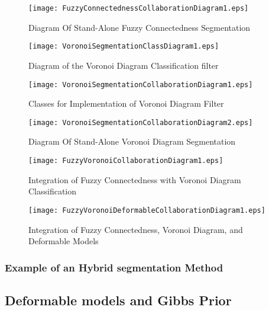 \begin{figure}
\center
\texttt{[image: FuzzyConnectednessCollaborationDiagram1.eps]}
\caption{Diagram Of Stand-Alone Fuzzy Connectedness Segmentation}
\label{fig:UMLCollaborationDiagramoftheFuzzyConnectednessFilter}
\end{figure}

\begin{figure}
\center
\texttt{[image: VoronoiSegmentationClassDiagram1.eps]}
\caption{Diagram of the Voronoi Diagram Classification filter}
\label{fig:UMLVoronoiSegmentationClassFilter}
\end{figure}

\begin{figure}
\center
\texttt{[image: VoronoiSegmentationCollaborationDiagram1.eps]}
\caption{Classes for Implementation of Voronoi Diagram Filter}
\label{fig:UMLClassesforImplementationofVoronoiDiagramFilter}
\end{figure}


\begin{figure}
\center
\texttt{[image: VoronoiSegmentationCollaborationDiagram2.eps]}
\caption{Diagram Of Stand-Alone Voronoi Diagram Segmentation}
\label{fig:UMLCollaborationDiagramoftheVoronoiSegmentationFilter}
\end{figure}


\begin{figure}
\center
\texttt{[image: FuzzyVoronoiCollaborationDiagram1.eps]}
\caption{Integration of Fuzzy Connectedness with Voronoi Diagram Classification}
\label{fig:UMLHybridMethodDiagram1}
\end{figure}

\begin{figure}
\center
\texttt{[image: FuzzyVoronoiDeformableCollaborationDiagram1.eps]}
\caption{Integration of Fuzzy Connectedness, Voronoi Diagram, and Deformable Models}
\label{fig:UMLHybridMethodDiagram2}
\end{figure}



\subsubsection{Example of an Hybrid segmentation Method}
\label{sec:HybridMethod1:Example}





\subsection{Deformable models and Gibbs Prior}

